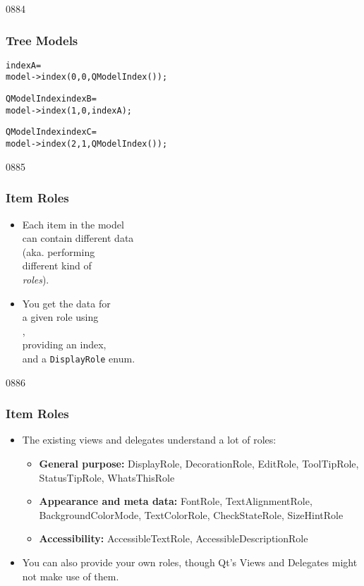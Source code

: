 \begin{slide}[fragile]{0884}
\frametitle{Tree Models}
\begin{alltt}
 indexA = 
  model->index(0, 0, QModelIndex());

QModelIndex indexB = 
  model->index(1, 0, indexA);

QModelIndex indexC = 
  model->index(2, 1, QModelIndex());
\end{alltt}
\end{slide}

\begin{slide}{0885}\frametitle{Item Roles}\label{itemRoles}
\begin{itemize}
\item Each item in the model\\
  can contain different data\\
  (aka. performing\\
  different kind of\\
  \emph{roles}).
\item You get the data for\\
  a given role using\\
  ,\\
  providing an index,\\
  and a \texttt{DisplayRole} enum.
\end{itemize}
\end{slide}

\begin{slide}{0886}\frametitle{Item Roles}
\begin{itemize}
\item The existing views and delegates understand a lot of roles:
  \begin{itemize}
  \item \textbf{General purpose:} DisplayRole, DecorationRole,
    EditRole, ToolTipRole, StatusTipRole, WhatsThisRole
  \item \textbf{Appearance and meta data:} FontRole, TextAlignmentRole,
    BackgroundColorMode, TextColorRole, CheckStateRole, SizeHintRole
  \item \textbf{Accessibility:} AccessibleTextRole, AccessibleDescriptionRole
  \end{itemize}
\item You can also provide your own roles, though Qt's Views and Delegates
  might not make use of them.
\end{itemize}
\end{slide}

